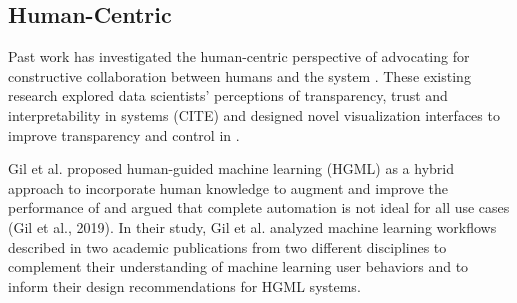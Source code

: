 


\subsection{Human-Centric \automl}
Past work has investigated the human-centric perspective of \automl advocating for constructive collaboration between humans and the \automl system \cite{Lee2019AHP,wang2018atmseer, gilHGML}. These existing research explored data scientists' perceptions of transparency, trust and interpretability in \automl systems (CITE) and designed novel visualization  interfaces to improve transparency and control in \automl\cite{wang2018atmseer, cashman et al snowcast}.   

Gil et al. proposed human-guided machine learning (HGML) as a hybrid approach to incorporate human knowledge to augment and improve the performance of \automl and argued that complete automation is not ideal for all use cases (Gil et al., 2019). In their study, Gil et al. analyzed machine learning workflows described in two academic publications from two different disciplines to complement their understanding of machine learning user behaviors and to inform their design recommendations for HGML systems.

